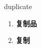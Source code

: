 
\begin{frame}
{\huge duplicate}
\begin{center}
\begin{enumerate}\Large
  \item \textbf{复制品}
  \item \textbf{复制}
\end{enumerate}
\end{center}
\end{frame}
